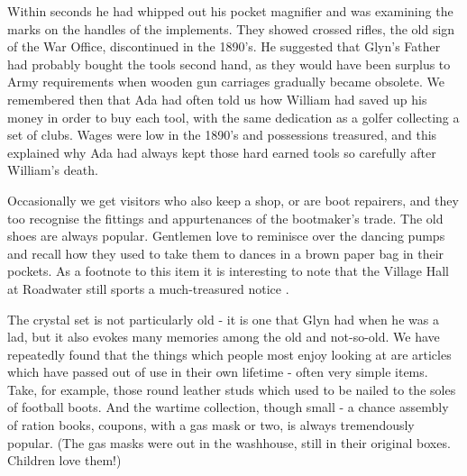 Within seconds he had whipped out his pocket magnifier and was examining the marks on the handles of the implements. They showed crossed rifles, the old sign of the War Office, discontinued in the 1890’s. He suggested that Glyn's Father had probably bought the tools second hand, as they would have been surplus to Army requirements when wooden gun carriages gradually became obsolete. We remembered then that Ada had often told us how William had saved up his money in order to buy each tool, with the same dedication as a golfer collecting a set of clubs. Wages were low in the 1890’s and possessions treasured, and this explained why Ada had always kept those hard earned tools so carefully after William's death.

Occasionally we get visitors who also keep a shop, or are boot repairers, and they too recognise the fittings and appurtenances of the bootmaker's trade. The old shoes are always popular. Gentlemen love to reminisce over the dancing pumps and recall how they used to take them to dances in a brown paper bag in their pockets. As a footnote to this item it is interesting to note that the Village Hall at Roadwater still sports a much-treasured notice .

The crystal set is not particularly old - it is one that Glyn had when he was a lad, but it also evokes many memories among the old and not-so-old. We have repeatedly found that the things which people most enjoy looking at are articles which have passed out of use in their own lifetime - often very simple items. Take, for example, those round leather studs which used to be nailed to the soles of football boots. And the wartime collection, though small - a chance assembly of ration books, coupons, with a gas mask or two, is always tremendously popular. (The gas masks were out in the washhouse, still in their original boxes. Children love them!)

